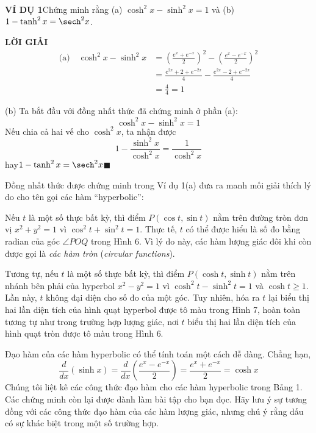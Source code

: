 \begin{minipage}[t]{0.70\textwidth}
    \vspace{0pt}
    \noindent\textbf{\textsf{\color{stewartcyan}VÍ DỤ 1}}\hspace{0.8em}Chứng minh rằng (a) $\cosh^2 x - \sinh^2 x = 1$ và (b) $1 - \tanh^2 x = \sech^2 x$.

    \vskip 6pt
    \noindent\textbf{\textsf{\color{stewartcyan}LỜI GIẢI}}
    \begin{align*}
    \text{(a)}\quad \cosh^2 x - \sinh^2 x &= \left( \frac{e^x + e^{-x}}{2} \right)^2 - \left( \frac{e^x - e^{-x}}{2} \right)^2 \\[5pt]
    &= \frac{e^{2x} + 2 + e^{-2x}}{4} - \frac{e^{2x} - 2 + e^{-2x}}{4} \\[5pt]
    &= \frac{4}{4} = 1
    \end{align*}

    \noindent (b) Ta bắt đầu với đồng nhất thức đã chứng minh ở phần (a):
    \[
    \cosh^2 x - \sinh^2 x = 1
    \]
    Nếu chia cả hai vế cho $\cosh^2 x$, ta nhận được
    \[
    1 - \frac{\sinh^2 x}{\cosh^2 x} = \frac{1}{\cosh^2 x}
    \]
    \noindent hay\hspace{2.5em}$1 - \tanh^2 x = \sech^2 x$\hfill{\color{stewartcyan}$\blacksquare$}

    \vskip 9pt
    \noindent Đồng nhất thức được chứng minh trong Ví dụ 1(a) đưa ra manh mối giải thích lý do cho tên gọi các hàm ``hyperbolic'':

    \vskip 4pt
    Nếu $t$ là một số thực bất kỳ, thì điểm $P(\cos t, \sin t)$ nằm trên đường tròn đơn vị $x^2 + y^2 = 1$ vì $\cos^2 t + \sin^2 t = 1$. Thực tế, $t$ có thể được hiểu là số đo bằng radian của góc $\angle POQ$ trong Hình 6. Vì lý do này, các hàm lượng giác đôi khi còn được gọi là \textit{các hàm tròn} (\textit{circular functions}).

    \vskip 4pt
    Tương tự, nếu $t$ là một số thực bất kỳ, thì điểm $P(\cosh t, \sinh t)$ nằm trên nhánh bên phải của hyperbol $x^2 - y^2 = 1$ vì $\cosh^2 t - \sinh^2 t = 1$ và $\cosh t \ge 1$. Lần này, $t$ không đại diện cho số đo của một góc. Tuy nhiên, hóa ra $t$ lại biểu thị hai lần diện tích của hình quạt hyperbol được tô màu trong Hình 7, hoàn toàn tương tự như trong trường hợp lượng giác, nơi $t$ biểu thị hai lần diện tích của hình quạt tròn được tô màu trong Hình 6.

    \vskip 4pt
    Đạo hàm của các hàm hyperbolic có thể tính toán một cách dễ dàng. Chẳng hạn,
    \[
    \frac{d}{dx}(\sinh x) = \frac{d}{dx}\left(\frac{e^x - e^{-x}}{2}\right) = \frac{e^x + e^{-x}}{2} = \cosh x
    \]
    Chúng tôi liệt kê các công thức đạo hàm cho các hàm hyperbolic trong Bảng 1. Các chứng minh còn lại được dành làm bài tập cho bạn đọc. Hãy lưu ý sự tương đồng với các công thức đạo hàm của các hàm lượng giác, nhưng chú ý rằng dấu có sự khác biệt trong một số trường hợp.


\end{minipage}
